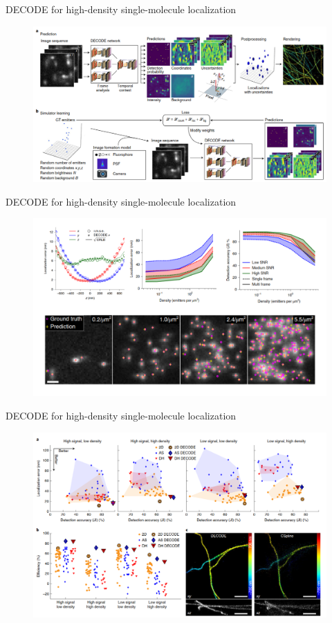 \documentclass{beamer}			%
\begin{document}
\begin{frame}{DECODE for high-density single-molecule localization}
\begin{figure}
\includegraphics[width=13cm]{decode/Figure-1.png}
\end{figure}
\end{frame}

\begin{frame}{DECODE for high-density single-molecule localization}
\begin{figure}
\includegraphics[width=13cm]{decode/Figure-2.png}
\end{figure}
\end{frame}


\begin{frame}{DECODE for high-density single-molecule localization}
\begin{figure}
\includegraphics[width=13cm]{decode/Figure-3.png}
\end{figure}
\end{frame}
\end{document}
